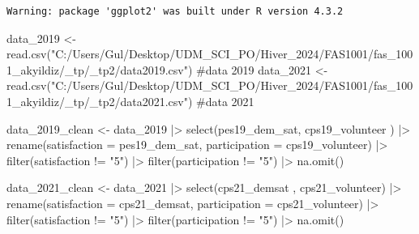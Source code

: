 \documentclass[
  letterpaper,
  DIV=11,
  numbers=noendperiod]{scrartcl}
\newenvironment{Shaded}{\begin{snugshade}}{\end{snugshade}}
\newcommand{\AttributeTok}[1]{\textcolor[rgb]{0.40,0.45,0.13}{#1}}
\newcommand{\CommentTok}[1]{\textcolor[rgb]{0.37,0.37,0.37}{#1}}
\newcommand{\FunctionTok}[1]{\textcolor[rgb]{0.28,0.35,0.67}{#1}}
\newcommand{\NormalTok}[1]{\textcolor[rgb]{0.00,0.23,0.31}{#1}}
\newcommand{\OtherTok}[1]{\textcolor[rgb]{0.00,0.23,0.31}{#1}}
\newcommand{\SpecialCharTok}[1]{\textcolor[rgb]{0.37,0.37,0.37}{#1}}
\newcommand{\StringTok}[1]{\textcolor[rgb]{0.13,0.47,0.30}{#1}}
\begin{document}
\begin{verbatim}
Warning: package 'ggplot2' was built under R version 4.3.2
\end{verbatim}

\begin{Shaded}
\begin{Highlighting}[]
\NormalTok{data\_2019 }\OtherTok{\textless{}{-}} \FunctionTok{read.csv}\NormalTok{(}\StringTok{"C:/Users/Gul/Desktop/UDM\_SCI\_PO/Hiver\_2024/FAS1001/fas\_1001\_akyildiz/\_tp/\_tp2/data2019.csv"}\NormalTok{) }\CommentTok{\#data 2019}
\NormalTok{data\_2021 }\OtherTok{\textless{}{-}} \FunctionTok{read.csv}\NormalTok{(}\StringTok{"C:/Users/Gul/Desktop/UDM\_SCI\_PO/Hiver\_2024/FAS1001/fas\_1001\_akyildiz/\_tp/\_tp2/data2021.csv"}\NormalTok{) }\CommentTok{\#data 2021}
\end{Highlighting}
\end{Shaded}

\begin{Shaded}
\begin{Highlighting}[]
\NormalTok{data\_2019\_clean }\OtherTok{\textless{}{-}}\NormalTok{ data\_2019 }\SpecialCharTok{|\textgreater{}}
\FunctionTok{select}\NormalTok{(pes19\_dem\_sat, cps19\_volunteer   ) }\SpecialCharTok{|\textgreater{}}
    \FunctionTok{rename}\NormalTok{(}\AttributeTok{satisfaction =}\NormalTok{ pes19\_dem\_sat, }\AttributeTok{participation =}\NormalTok{ cps19\_volunteer) }\SpecialCharTok{|\textgreater{}}
    \FunctionTok{filter}\NormalTok{(satisfaction }\SpecialCharTok{!=} \StringTok{"5"}\NormalTok{) }\SpecialCharTok{|\textgreater{}}
    \FunctionTok{filter}\NormalTok{(participation }\SpecialCharTok{!=} \StringTok{"5"}\NormalTok{) }\SpecialCharTok{|\textgreater{}}
  \FunctionTok{na.omit}\NormalTok{() }
\end{Highlighting}
\end{Shaded}

\begin{Shaded}
\begin{Highlighting}[]
\NormalTok{data\_2021\_clean }\OtherTok{\textless{}{-}}\NormalTok{ data\_2021 }\SpecialCharTok{|\textgreater{}}
  \FunctionTok{select}\NormalTok{(cps21\_demsat   , cps21\_volunteer) }\SpecialCharTok{|\textgreater{}}
    \FunctionTok{rename}\NormalTok{(}\AttributeTok{satisfaction =}\NormalTok{ cps21\_demsat,}
         \AttributeTok{participation =}\NormalTok{ cps21\_volunteer) }\SpecialCharTok{|\textgreater{}}
    \FunctionTok{filter}\NormalTok{(satisfaction }\SpecialCharTok{!=} \StringTok{"5"}\NormalTok{) }\SpecialCharTok{|\textgreater{}}
    \FunctionTok{filter}\NormalTok{(participation }\SpecialCharTok{!=} \StringTok{"5"}\NormalTok{) }\SpecialCharTok{|\textgreater{}}
  \FunctionTok{na.omit}\NormalTok{() }
\end{Highlighting}
\end{Shaded}
\end{document}
